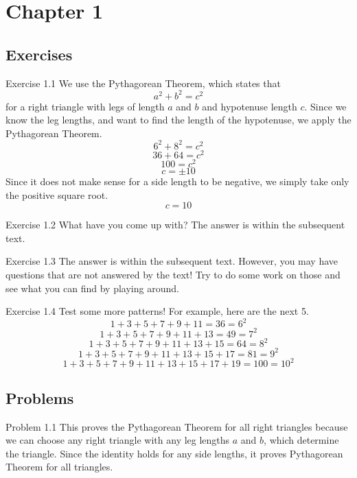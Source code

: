 \section{Chapter 1}
\subsection{Exercises}

\begin{sol}{Exercise 1.1}
We use the Pythagorean Theorem, which states that
\[
a^2 + b^2 = c^2
\]
for a right triangle with legs of length $a$ and $b$ and hypotenuse length $c$. Since we know the leg lengths, and want to find the length of the hypotenuse, we apply the Pythagorean Theorem.
\[
6^2 + 8^2 = c^2
\]
\[
36 + 64 = c^2
\]
\[
100 = c^2
\]
\[
c = \pm 10
\]
Since it does not make sense for a side length to be negative, we simply take only the positive square root.
\[
c = 10
\]
\end{sol}

\begin{sol}{Exercise 1.2}
What have you come up with? The answer is within the subsequent text. 
\end{sol}


\begin{sol}{Exercise 1.3}
The answer is within the subsequent text. However, you may have questions that are not answered by the text! Try to do some work on those and see what you can find by playing around. 
\end{sol}


\begin{sol}{Exercise 1.4}
Test some more patterns! For example, here are the next 5. 
\[
1 + 3 + 5 + 7 + 9 + 11 = 36 = 6^2
\]
\[
1 + 3 + 5 + 7 + 9 + 11 + 13 = 49 = 7^2
\]
\[
1 + 3 + 5 + 7 + 9 + 11 + 13 + 15 = 64 = 8^2
\]
\[
1 + 3 + 5 + 7 + 9 + 11 + 13 + 15 + 17 = 81 = 9^2
\]
\[
1 + 3 + 5 + 7 + 9 + 11 + 13 + 15 + 17 + 19 = 100 = 10^2
\]
\end{sol}

\subsection{Problems}
\begin{sol}{Problem 1.1}
This proves the Pythagorean Theorem for all right triangles because we can choose any right triangle with any leg lengths $a$ and $b$, which determine the triangle. Since the identity holds for any side lengths, it proves Pythagorean Theorem for all triangles.
\end{sol}


